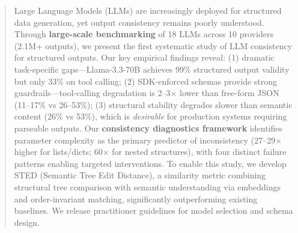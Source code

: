 \documentclass{article}
\theoremstyle{plain}
\theoremstyle{definition}
\begin{document}

\printAffiliationsAndNotice{\icmlEqualContribution}

\begin{abstract}
Large Language Models (LLMs) are increasingly deployed for structured data generation, yet output consistency remains poorly understood. Through \textbf{large-scale benchmarking} of 18 LLMs across 10 providers (2.1M+ outputs), we present the first systematic study of LLM consistency for structured outputs. Our key empirical findings reveal: (1) dramatic task-specific gaps---Llama-3.3-70B achieves 99\% structured output validity but only 33\% on tool calling; (2) SDK-enforced schemas provide strong guardrails---tool-calling degradation is 2--3$\times$ lower than free-form JSON (11--17\% vs 26--53\%); (3) structural stability degrades slower than semantic content (26\% vs 53\%), which is \textit{desirable} for production systems requiring parseable outputs. Our \textbf{consistency diagnostics framework} identifies parameter complexity as the primary predictor of inconsistency (27--29$\times$ higher for lists/dicts; 60$\times$ for nested structures), with four distinct failure patterns enabling targeted interventions. To enable this study, we develop STED (Semantic Tree Edit Distance), a similarity metric combining structural tree comparison with semantic understanding via embeddings and order-invariant matching, significantly outperforming existing baselines. We release practitioner guidelines for model selection and schema design.
\end{abstract}

\let\thefootnote\relax{}
\end{document}
